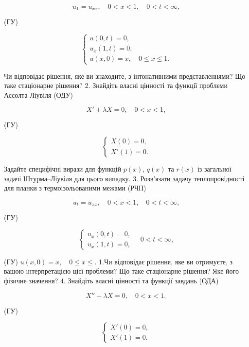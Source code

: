 \documentclass[
  ukrainian,
]{article}
\begin{document}
\[
u_1 = u_{xx}, \quad 0 < x < 1, \quad 0 < t < \infty,
\]

(ГУ)

\[
\begin{cases} u(0, t) = 0, \\ u_x(1, t) = 0, \\ u(x, 0) = x, \quad 0 \le x \le 1. \end{cases}
\]

Чи відповідає рішення, яке ви знаходите, з інтонативними
представленнями? Що таке стаціонарне рішення? 2. Знайдіть власні
цінності та функції проблеми Ассолта-Ліувіля (ОДУ)

\[
X' + \lambda X = 0, \quad 0 < x < 1,
\]

(ГУ)

\[
\begin{cases} X(0) = 0, \\ X'(1) = 0. \end{cases}
\]

Задайте специфічні вирази для функцій \(p(x)\), \(q(x)\) та \(r(x)\) із
загальної задачі Штурма--Ліувіля для цього випадку. 3. Розв'язати задачу
теплопровідності для планки з термоізольованими межами (РЧП)

\[
u_t = u_{xx}, \quad 0 < x < 1, \quad 0 < t < \infty,
\]

(ГУ)

\[
\begin{cases} u_x (0, t) = 0, \\ u_x (1, t) = 0, \end{cases} \quad 0 < t < \infty,
\]

(ГУ) \(u(x, 0) = x, \quad 0 \le x \le.\) 1.Чи відповідає рішення, яке ви
отримуєте, з вашою інтерпретацією цієї проблеми? Що таке стаціонарне
рішення? Яке його фізичне значення? 4. Знайдіть власні цінності та
функції завдань (ОДА)

\[
X'' + \lambda X = 0, \quad 0 < x < 1,
\]

(ГУ)

\[
\begin{cases} X'(0) = 0, \\ X'(1) = 0. \end{cases}
\]
\end{document}
